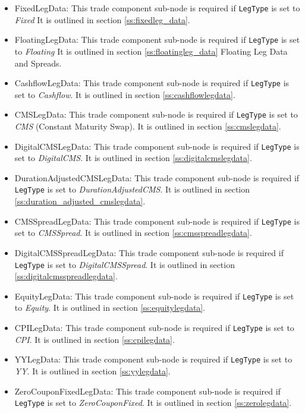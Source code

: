 \begin{itemize}
\item FixedLegData: This trade component sub-node is required if \lstinline!LegType! is set to \emph{Fixed} It is
outlined in section \ref{ss:fixedleg_data}.
\item FloatingLegData: This trade component sub-node is required if \lstinline!LegType! is set to \emph{Floating} It is
outlined in section \ref{ss:floatingleg_data} Floating Leg Data and Spreads.
\item CashflowLegData: This trade component sub-node is required if \lstinline!LegType! is set to \emph{Cashflow}. It is
  outlined in section \ref{ss:cashflowlegdata}.
\item CMSLegData: This trade component sub-node is required if \lstinline!LegType! is set to \emph{CMS} (Constant Maturity Swap). It is
  outlined in section \ref{ss:cmslegdata}.
\item DigitalCMSLegData: This trade component sub-node is required if \lstinline!LegType! is set to \emph{DigitalCMS}. It is
  outlined in section \ref{ss:digitalcmslegdata}.
\item DurationAdjustedCMSLegData: This trade component sub-node is required if \lstinline!LegType! is set to \emph{DurationAdjustedCMS}. It is
  outlined in section \ref{ss:duration_adjusted_cmslegdata}.  
\item CMSSpreadLegData: This trade component sub-node is required if \lstinline!LegType! is set to \emph{CMSSpread}. It is
  outlined in section \ref{ss:cmsspreadlegdata}.
\item DigitalCMSSpreadLegData: This trade component sub-node is required if \lstinline!LegType! is set to \emph{DigitalCMSSpread}. It is
  outlined in section \ref{ss:digitalcmsspreadlegdata}.
\item EquityLegData: This trade component sub-node is required if \lstinline!LegType! is set to \emph{Equity}. It is
  outlined in section \ref{ss:equitylegdata}.    
\item CPILegData: This trade component sub-node is required if \lstinline!LegType! is set to \emph{CPI}. It is
  outlined in section \ref{ss:cpilegdata}.
\item YYLegData: This trade component sub-node is required if \lstinline!LegType! is set to \emph{YY}. It is
  outlined in section \ref{ss:yylegdata}.
\item ZeroCouponFixedLegData: This trade component sub-node is required if \lstinline!LegType! is set to \emph{ZeroCouponFixed}. It is
  outlined in section \ref{ss:zerolegdata}.
\end{itemize}

